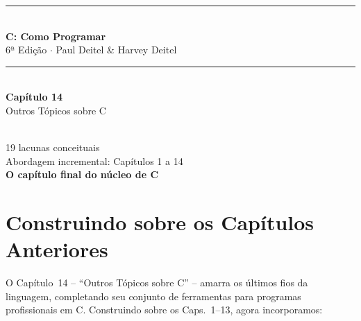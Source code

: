 \documentclass[12pt,a4paper]{article}
\begin{document}
\begin{titlepage}
  \centering\vspace*{2cm}
  {\color{deitelblue}\rule{\linewidth}{2pt}}\\[0.4cm]
  {\huge\bfseries\color{deitelblue}C: Como Programar}\\[0.2cm]
  {\large\color{deitelblue}6ª Edição $\cdot$ Paul Deitel \& Harvey Deitel}\\[0.2cm]
  {\color{deitelblue}\rule{\linewidth}{2pt}}\\[1cm]
  {\LARGE\bfseries Capítulo 14}\\[0.3cm]
  {\Large\color{deitelblue!80}Outros Tópicos sobre C}\\[0.8cm]
  \begin{tcolorbox}[colback=deitellightblue,colframe=deitelblue,width=0.85\linewidth]
    \\[0.2cm]
    {\normalsize 19 lacunas conceituais\\
    Abordagem incremental: Capítulos 1 a 14\\[0.2cm]
    \textbf{O capítulo final do núcleo de C}}
  \end{tcolorbox}
\end{titlepage}

\section*{Construindo sobre os Capítulos Anteriores}

O Capítulo~14 -- ``Outros Tópicos sobre C'' -- amarra os últimos fios da
linguagem, completando seu conjunto de ferramentas para programas profissionais
em C. Construindo sobre os Caps.~1--13, agora incorporamos:
\end{document}
